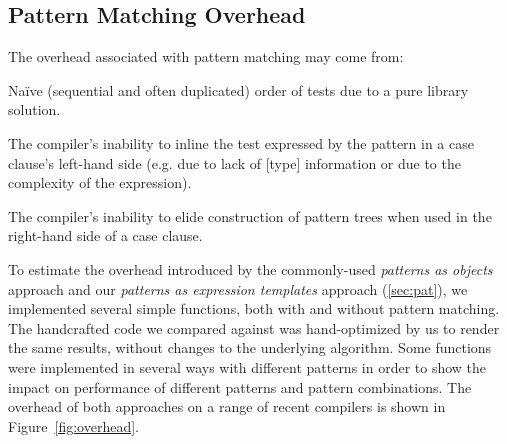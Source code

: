 \subsection{Pattern Matching Overhead}
\label{sec:patcmp}

The overhead associated with pattern matching may come from:

\begin{compactitem}
\setlength{\itemsep}{0pt}
\setlength{\parskip}{0pt}
\item Na\"ive (sequential and often duplicated) order of tests due to a pure 
      library solution. 
\item The compiler's inability to inline the test expressed by the pattern in a case clause's
      left-hand side (e.g. due to lack of [type] information 
      or due to the complexity of the expression). 
\item The compiler's inability to elide construction of pattern trees when used in 
      the right-hand side of a case clause.
\end{compactitem}

\noindent
To estimate the overhead introduced by the commonly-used \emph{patterns as objects} 
approach and our \emph{patterns as expression 
templates} approach (\textsection\ref{sec:pat}), we implemented several simple
functions, both with and without pattern matching. The handcrafted code we compared 
against was hand-optimized by us to render the same results, without changes to 
the underlying algorithm. Some functions were implemented in several ways with 
different patterns in order to show the impact on performance of different patterns and pattern 
combinations. The overhead of both approaches on a range of 
recent \Cpp{} compilers is shown in Figure~\ref{fig:overhead}.

